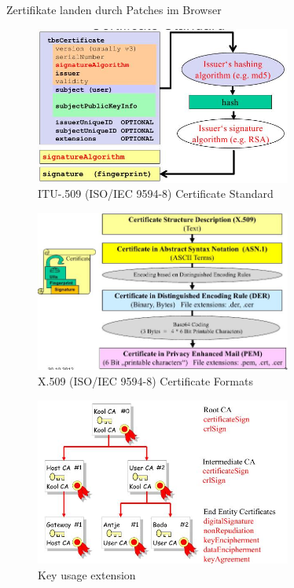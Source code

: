 \documentclass[ngerman,a4paper,12pt]{scrreprt}
\begin{document}
\ul
	\li Zertifikate landen durch Patches im Browser
\ulE
\begin{figure}[H]
	\centering
	\includegraphics[width=0.75\textwidth]{img/V7.6.jpg}
	\caption{ITU-.509 (ISO/IEC 9594-8) Certificate Standard}
	\label{}
\end{figure}

\begin{figure}[H]
	\centering
	\includegraphics[width=0.75\textwidth]{img/V7.7.jpg}
	\caption{X.509 (ISO/IEC 9594-8) Certificate Formats}
	\label{}
\end{figure}

\begin{figure}[H]
	\centering
	\includegraphics[width=0.75\textwidth]{img/V7.8.jpg}
	\caption{Key usage extension}
	\label{}
\end{figure}
\end{document}
